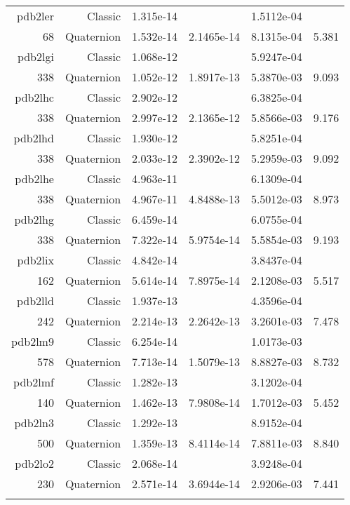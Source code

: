\begin{xltabular}{\textwidth}{r|rS[table-format=1.3e+2]S[table-format=1.4e+2]S[table-format=1.4e+2]S[table-format=-1.3]}
pdb2ler & Classic & 1.315e-14 &  & 1.5112e-04 & \\
68 & Quaternion & 1.532e-14 & 2.1465e-14 & 8.1315e-04 & 5.381\\  \addlinespace
pdb2lgi & Classic & 1.068e-12 &  & 5.9247e-04 & \\
338 & Quaternion & 1.052e-12 & 1.8917e-13 & 5.3870e-03 & 9.093\\  \addlinespace
pdb2lhc & Classic & 2.902e-12 &  & 6.3825e-04 & \\
338 & Quaternion & 2.997e-12 & 2.1365e-12 & 5.8566e-03 & 9.176\\  \addlinespace
pdb2lhd & Classic & 1.930e-12 &  & 5.8251e-04 & \\
338 & Quaternion & 2.033e-12 & 2.3902e-12 & 5.2959e-03 & 9.092\\  \addlinespace
pdb2lhe & Classic & 4.963e-11 &  & 6.1309e-04 & \\
338 & Quaternion & 4.967e-11 & 4.8488e-13 & 5.5012e-03 & 8.973\\  \addlinespace
pdb2lhg & Classic & 6.459e-14 &  & 6.0755e-04 & \\
338 & Quaternion & 7.322e-14 & 5.9754e-14 & 5.5854e-03 & 9.193\\  \addlinespace
pdb2lix & Classic & 4.842e-14 &  & 3.8437e-04 & \\
162 & Quaternion & 5.614e-14 & 7.8975e-14 & 2.1208e-03 & 5.517\\  \addlinespace
pdb2lld & Classic & 1.937e-13 &  & 4.3596e-04 & \\
242 & Quaternion & 2.214e-13 & 2.2642e-13 & 3.2601e-03 & 7.478\\  \addlinespace
pdb2lm9 & Classic & 6.254e-14 &  & 1.0173e-03 & \\
578 & Quaternion & 7.713e-14 & 1.5079e-13 & 8.8827e-03 & 8.732\\  \addlinespace
pdb2lmf & Classic & 1.282e-13 &  & 3.1202e-04 & \\
140 & Quaternion & 1.462e-13 & 7.9808e-14 & 1.7012e-03 & 5.452\\  \addlinespace
pdb2ln3 & Classic & 1.292e-13 &  & 8.9152e-04 & \\
500 & Quaternion & 1.359e-13 & 8.4114e-14 & 7.8811e-03 & 8.840\\  \addlinespace
pdb2lo2 & Classic & 2.068e-14 &  & 3.9248e-04 & \\
230 & Quaternion & 2.571e-14 & 3.6944e-14 & 2.9206e-03 & 7.441\\  \addlinespace

\end{xltabular}
